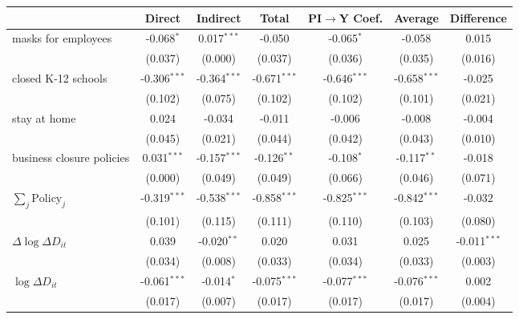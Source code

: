 
\begin{tabular}{lccccc|>{}c}
\toprule
  & Direct & Indirect & Total & PI$\to$Y Coef. & Average & Difference\\
\midrule
masks for employees & -0.068$^{*}$ & 0.017$^{***}$ & -0.050 & -0.065$^{*}$ & -0.058 & 0.015\\
 & (0.037) & (0.000) & (0.037) & (0.036) & (0.035) & (0.016)\\
closed K-12 schools & -0.306$^{***}$ & -0.364$^{***}$ & -0.671$^{***}$ & -0.646$^{***}$ & -0.658$^{***}$ & -0.025\\
 & (0.102) & (0.075) & (0.102) & (0.102) & (0.101) & (0.021)\\
stay at home & 0.024 & -0.034 & -0.011 & -0.006 & -0.008 & -0.004\\
 & (0.045) & (0.021) & (0.044) & (0.042) & (0.043) & (0.010)\\
business closure policies & 0.031$^{***}$ & -0.157$^{***}$ & -0.126$^{**}$ & -0.108$^{*}$ & -0.117$^{**}$ & -0.018\\
 & (0.000) & (0.049) & (0.049) & (0.066) & (0.046) & (0.071)\\
$\sum_j \mathrm{Policy}_j$ & -0.319$^{***}$ & -0.538$^{***}$ & -0.858$^{***}$ & -0.825$^{***}$ & -0.842$^{***}$ & -0.032\\
 & (0.101) & (0.115) & (0.111) & (0.110) & (0.103) & (0.080)\\
$\Delta \log \Delta D_{it}$ & 0.039 & -0.020$^{**}$ & 0.020 & 0.031 & 0.025 & -0.011$^{***}$\\
 & (0.034) & (0.008) & (0.033) & (0.034) & (0.033) & (0.003)\\
$\log \Delta D_{it}$ & -0.061$^{***}$ & -0.014$^{*}$ & -0.075$^{***}$ & -0.077$^{***}$ & -0.076$^{***}$ & 0.002\\
 & (0.017) & (0.007) & (0.017) & (0.017) & (0.017) & (0.004)\\
\bottomrule
\end{tabular}